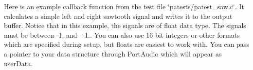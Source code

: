 \begin{DoxyCode}{0}

\end{DoxyCode}
 Here is an example callback function from the test file \char`\"{}patests/patest\+\_\+saw.\+c\char`\"{}. It calculates a simple left and right sawtooth signal and writes it to the output buffer. Notice that in this example, the signals are of float data type. The signals must be between -\/1. and +1.. You can also use 16 bit integers or other formats which are specified during setup, but floats are easiest to work with. You can pass a pointer to your data structure through Port\+Audio which will appear as user\+Data.



